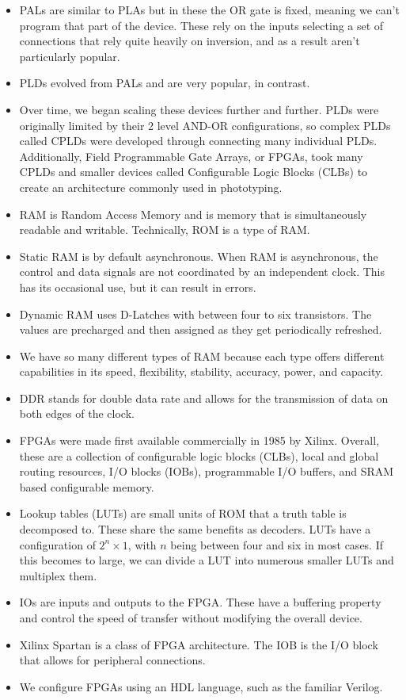 \documentclass[10pt,a4paper]{article}
\begin{document}
\begin{itemize}
\item PALs are similar to PLAs but in these the OR gate is fixed, meaning we can't program that part of the device. These rely on the inputs selecting a set of connections that rely quite heavily on inversion, and as a result aren't particularly popular. 
\item PLDs evolved from PALs and are very popular, in contrast.
\item Over time, we began scaling these devices further and further. PLDs were originally limited by their 2 level AND-OR configurations, so complex PLDs called CPLDs were developed through connecting many individual PLDs. Additionally, Field Programmable Gate Arrays, or FPGAs, took many CPLDs and smaller devices called Configurable Logic Blocks (CLBs) to create an architecture commonly used in phototyping.
\item RAM is Random Access Memory and is memory that is simultaneously readable and writable. Technically, ROM is a type of RAM.
\item Static RAM is by default asynchronous. When RAM is asynchronous, the control and data signals are not coordinated by an independent clock. This has its occasional use, but it can result in errors. 
\item Dynamic RAM uses D-Latches with between four to six transistors. The values are precharged and then assigned as they get periodically refreshed. 
\item We have so many different types of RAM because each type offers different capabilities in its speed, flexibility, stability, accuracy, power, and capacity. 
\item DDR stands for double data rate and allows for the transmission of data on both edges of the clock. 
\item FPGAs were made first available commercially in 1985 by Xilinx. Overall, these are a collection of configurable logic blocks (CLBs), local and global routing resources, I/O blocks (IOBs), programmable I/O buffers, and SRAM based configurable memory.
\item Lookup tables (LUTs) are small units of ROM that a truth table is decomposed to. These share the same benefits as decoders. LUTs have a configuration of $2^n\times1$, with $n$ being between four and six in most cases. If this becomes to large, we can divide a LUT into numerous smaller LUTs and multiplex them.
\item IOs are inputs and outputs to the FPGA. These have a buffering property and control the speed of transfer without modifying the overall device. 
\item Xilinx Spartan is a class of FPGA architecture. The IOB is the I/O block that allows for peripheral connections.
\item We configure FPGAs using an HDL language, such as the familiar Verilog. 
\end{itemize}
\end{document}

